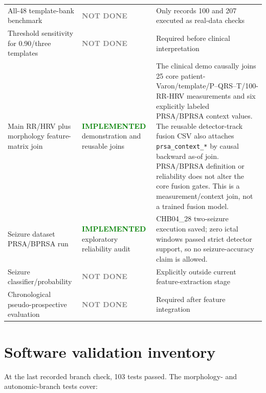 \documentclass[11pt,a4paper]{article}
\newcommand{\implemented}{\textcolor{green}{\textbf{IMPLEMENTED}}}
\newcommand{\notdone}{\textcolor{gray}{\textbf{NOT DONE}}}
\begin{document}
\begin{longtable}{p{}p{}p{}}
All-48 template-bank benchmark & \notdone & Only records 100 and 207 executed as real-data checks \\
Threshold sensitivity for 0.90/three templates & \notdone & Required before clinical interpretation \\
Main RR/HRV plus morphology feature-matrix join & \implemented{} demonstration and reusable joins & The clinical demo causally joins 25 core patient-Varon/template/P--QRS--T/100-RR-HRV measurements and six explicitly labeled PRSA/BPRSA context values. The reusable detector-track fusion CSV also attaches \texttt{prsa\_context\_*} by causal backward as-of join. PRSA/BPRSA definition or reliability does not alter the core fusion gates. This is a measurement/context join, not a trained fusion model. \\
Seizure dataset PRSA/BPRSA run & \implemented{} exploratory reliability audit & CHB04\_28 two-seizure execution saved; zero ictal windows passed strict detector support, so no seizure-accuracy claim is allowed. \\
Seizure classifier/probability & \notdone & Explicitly outside current feature-extraction stage \\
Chronological pseudo-prospective evaluation & \notdone & Required after feature integration \\
\bottomrule
\end{longtable}

\section{Software validation inventory}

At the last recorded branch check, 103 tests passed. The morphology- and autonomic-branch tests cover:
\end{document}
